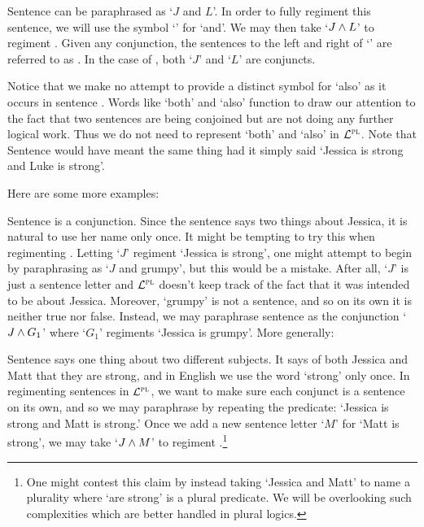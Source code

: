 Sentence  can be paraphrased as `$J$ and $L$'.
In order to fully regiment this sentence, we will use the  symbol `\eand' for `and'.
We may then take `$J\wedge L$' to regiment .
Given any conjunction, the sentences to the left and right of `\eand' are referred to as .
In the case of , both `$J$' and `$L$' are conjuncts.

Notice that we make no attempt to provide a distinct symbol for `also' as it occurs in sentence .
Words like `both' and `also' function to draw our attention to the fact that two sentences are being conjoined but are not doing any further logical work.
Thus we do not need to represent `both' and `also' in $\mathcal{L}^{\textsc{pl}}$.
Note that Sentence  would have meant the same thing had it simply said `Jessica is strong and Luke is strong'.

Here are some more examples:

\begin{earg} \label{grumpy}
\end{earg}

Sentence  is a conjunction.
Since the sentence says two things about Jessica, it is natural to use her name only once.
It might be tempting to try this when regimenting .
Letting `$J$' regiment `Jessica is strong', one might attempt to begin by paraphrasing  as `$J$ and grumpy', but this would be a mistake.
After all, `$J$' is just a sentence letter and $\mathcal{L}^{\textsc{pl}}$ doesn't keep track of the fact that it was intended to be about Jessica.
Moreover, `grumpy' is not a sentence, and so on its own it is neither true nor false.
Instead, we may paraphrase sentence  as the conjunction `$J \wedge G_{1}$' where `$G_{1}$' regiments `Jessica is grumpy'.
More generally:


Sentence  says one thing about two different subjects.
It says of both Jessica and Matt that they are strong, and in English we use the word `strong' only once.
In regimenting sentences in $\mathcal{L}^{\textsc{pl}}$, we want to make sure each conjunct is a sentence on its own, and so we may paraphrase  by repeating the predicate: `Jessica is strong and Matt is strong.'
Once we add a new sentence letter `$M$' for `Matt is strong', we may take `$J\wedge M$' to regiment .\footnote{One might contest this claim by instead taking `Jessica and Matt' to name a plurality where `are strong' is a plural predicate. We will be overlooking such complexities which are better handled in plural logics.}

